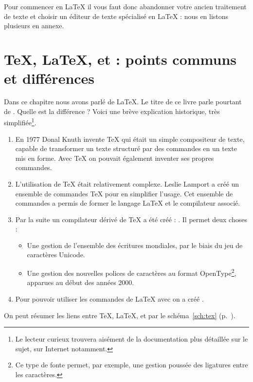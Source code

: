 Pour commencer en \LaTeX{} il vous faut donc abandonner votre ancien traitement de texte et choisir un éditeur de texte spécialisé en \LaTeX{} : nous en listons plusieurs en annexe.

\section[TeX, LaTeX, XeTeX, XeLaTeX : points communs et différences]{\TeX{}, \LaTeX{}, \XeTeX{} et \XeLaTeX{} : points communs et différences}\label{TeXLaTeX}

Dans ce chapitre nous avons parlé de \LaTeX{}. Le titre de ce livre parle pourtant  de \XeLaTeX{}. Quelle est la différence ? Voici une brève explication historique, très simplifiée\footnote{Le lecteur curieux trouvera aisément de la documentation plus détaillée sur le sujet, sur Internet notamment.}.

\begin{enumerate}
\item En 1977 Donal Knuth invente  \TeX{} qui était un simple compositeur de texte, capable de transformer un texte structuré par des commandes en un texte mis en forme. Avec \TeX{} on pouvait également inventer ses propres commandes.
\item L'utilisation de \TeX{} était relativement complexe. Leslie Lamport a créé un ensemble de commandes \TeX{} pour en simplifier l'usage. Cet ensemble de commandes a permis de former le langage \LaTeX{} et le compilateur associé.
\item Par la suite un compilateur dérivé de \TeX{} a été créé : \XeTeX{}. Il permet deux choses :
\begin{itemize}
	\item Une gestion  de l'ensemble des écritures mondiales, par le biais du jeu de caractères Unicode.
	\item Une gestion des nouvelles polices de caractères au format OpenType\footnote{Ce type de fonte permet, par exemple, une gestion poussée des ligatures entre les caractères.}, apparues au début des années 2000.

\end{itemize} 
\item Pour pouvoir utiliser les commandes de \LaTeX{} avec \XeTeX{} on a créé \XeLaTeX{}.
\end{enumerate}

On peut résumer les liens entre \TeX{}, \LaTeX{}, \XeTeX{} et \XeLaTeX{} par le schéma~\ref{sch:tex} (p.~\pageref{sch:tex}).

